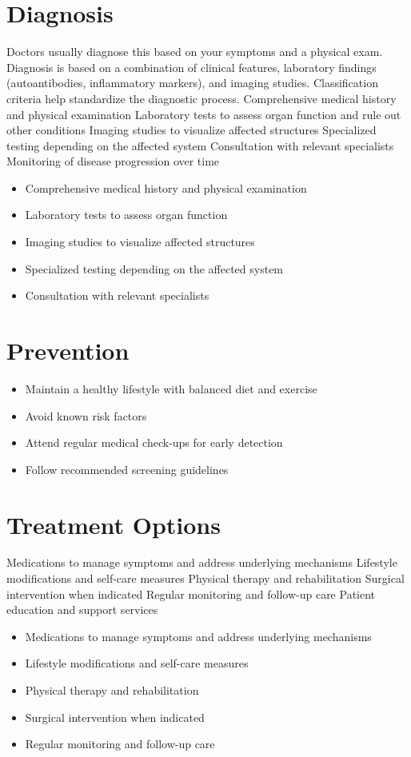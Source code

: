 \section{Diagnosis}
Doctors usually diagnose this based on your symptoms and a physical exam. Diagnosis is based on a combination of clinical features, laboratory findings (autoantibodies, inflammatory markers), and imaging studies. Classification criteria help standardize the diagnostic process. Comprehensive medical history and physical examination Laboratory tests to assess organ function and rule out other conditions Imaging studies to visualize affected structures Specialized testing depending on the affected system Consultation with relevant specialists Monitoring of disease progression over time

\begin{itemize}[noitemsep]
  \item Comprehensive medical history and physical examination
  \item Laboratory tests to assess organ function
  \item Imaging studies to visualize affected structures
  \item Specialized testing depending on the affected system
  \item Consultation with relevant specialists
\end{itemize}
\section{Prevention}
\begin{itemize}[noitemsep]
  \item Maintain a healthy lifestyle with balanced diet and exercise
  \item Avoid known risk factors
  \item Attend regular medical check-ups for early detection
  \item Follow recommended screening guidelines
\end{itemize}
\section{Treatment Options}
Medications to manage symptoms and address underlying mechanisms Lifestyle modifications and self-care measures Physical therapy and rehabilitation Surgical intervention when indicated Regular monitoring and follow-up care Patient education and support services

\begin{itemize}[noitemsep]
  \item Medications to manage symptoms and address underlying mechanisms
  \item Lifestyle modifications and self-care measures
  \item Physical therapy and rehabilitation
  \item Surgical intervention when indicated
  \item Regular monitoring and follow-up care
\end{itemize}
